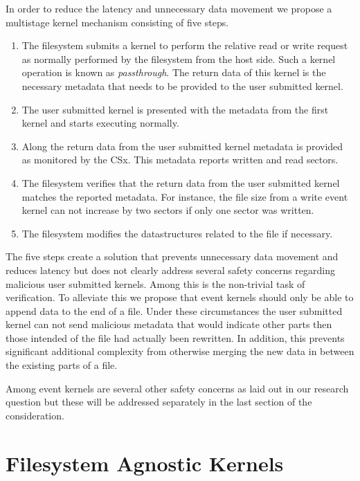 In order to reduce the latency and unnecessary data movement we propose a
multistage kernel mechanism consisting of five steps.

\begin{enumerate}
    \item The filesystem submits a kernel to perform the relative read or write
    request as normally performed by the filesystem from the host side. Such
    a kernel operation is known as \textit{passthrough}. The return data of this
    kernel is the necessary metadata that needs to be provided to the user
    submitted kernel.
    \item The user submitted kernel is presented with the metadata from the
    first kernel and starts executing normally.
    \item Along the return data from the user submitted kernel metadata is
    provided as monitored by the CSx. This metadata reports written and read
    sectors.
    \item The filesystem verifies that the return data from the user submitted
    kernel matches the reported metadata. For instance, the file size from a
    write event kernel can not increase by two sectors if only one sector
    was written.
    \item The filesystem modifies the datastructures related to the file if
    necessary.
\end{enumerate}

The five steps create a solution that prevents unnecessary data movement and
reduces latency but does not clearly address several safety concerns regarding
malicious user submitted kernels. Among this is the non-trivial task of
verification. To alleviate this we propose that event kernels should only be
able to append data to the end of a file. Under these circumstances the user
submitted kernel can not send malicious metadata that would indicate other parts
then those intended of the file had actually been rewritten. In addition, this
prevents significant additional complexity from otherwise merging the new
data in between the existing parts of a file.

Among event kernels are several other safety concerns as laid out in our
research question but these will be addressed separately in the last section of
the consideration.

\section{Filesystem Agnostic Kernels}

